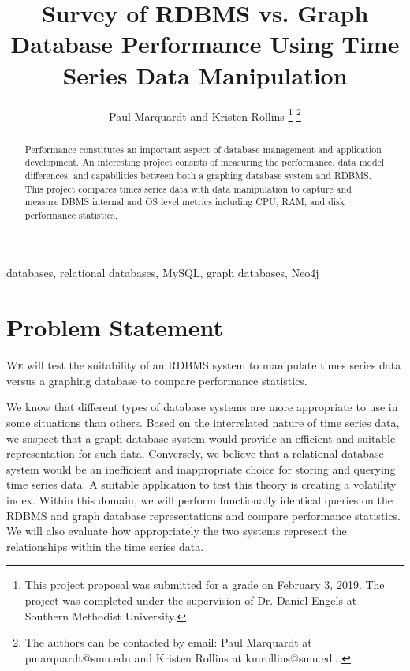 \documentclass{IEEEtran}
\begin{document}
	
\title{Survey of RDBMS vs. Graph Database Performance Using Time Series Data Manipulation}
\author{Paul Marquardt and Kristen Rollins %
\thanks{This project proposal was submitted for a grade on February 3, 2019. The project was completed under the supervision of Dr. Daniel Engels at Southern Methodist University.} 
\thanks{The authors can be contacted by email: Paul Marquardt at pmarquardt@smu.edu and Kristen Rollins at kmrollins@smu.edu.}}

\maketitle



\begin{abstract}
Performance constitutes an important aspect of database management and application development. An interesting project consists of measuring the performance, data model differences, and capabilities between both a graphing database system and RDBMS. This project compares times series data with data manipulation to capture and measure DBMS internal and OS level metrics including CPU, RAM, and disk performance statistics. 
\end{abstract}

\begin{IEEEkeywords}
	databases, relational databases, MySQL, graph databases, Neo4j
\end{IEEEkeywords}


\section{Problem Statement}

\lettrine{W}{e} will test the suitability of an RDBMS system to manipulate times series data versus a graphing database to compare performance statistics.

We know that different types of database systems are more appropriate to use in some situations than others. Based on the interrelated nature of time series data, we suspect that a graph database system would provide an efficient and suitable representation for such data. Conversely, we believe that a relational database system would be an inefficient and inappropriate choice for storing and querying time series data. A suitable application to test this theory is creating a volatility index. Within this domain, we will perform functionally identical queries on the RDBMS and graph database representations and compare performance statistics. We will also evaluate how appropriately the two systems represent the relationships within the time series data.
\end{document}
